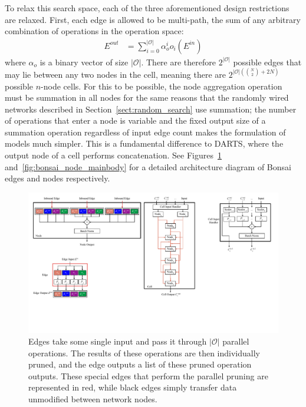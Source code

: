 To relax this search space, each of the three aforementioned design restrictions are relaxed. First, each edge is allowed to
be multi-path, the sum of any arbitrary combination of operations in the operation space:
\begin{align}
	E^{out} &= \sum_{i=0}^{|\mathcal{O}|} \alpha_o^i  o_i (E^{in}) \label{eq:op_weights}
\end{align}
\noindent where $\alpha_o$ is a binary vector of size $|\mathcal{O}|$. There are therefore $2^{|\mathcal{O}|}$ possible edges
that may lie between any two nodes in the cell, meaning there
are $2^{|\mathcal{O}| \left(\binom{N}{2} + 2N\right)}$ possible $n$-node cells. For this to be possible, the node aggregation operation
must be summation in all nodes for the same reasons that the randomly wired networks described in Section~\ref{sect:random_search} use
summation; the number of operations that enter a node is variable and the fixed output size of a summation operation regardless
of input edge count makes the formulation of models much simpler.  This is a fundamental difference to DARTS,
where the output node of a cell performs concatenation. See Figures~\ref{fig:bonsai_edge_mainbody}
and~\ref{fig:bonsai_node_mainbody} for a detailed architecture diagram of Bonsai edges and nodes respectively.
\clearpage
\begin{figure}[ht!]
	\centering
	 \hspace*{-3cm}\includegraphics[width=.6\textwidth]{edge}
	\caption[Bonsai edge where $|\mathcal{O}|=4$]{Edges take some single input and pass it through $|\mathcal{O}|$ parallel operations.
The results of these operations are then individually pruned, and the edge outputs a list of these pruned operation outputs. These special
	edges that perform the parallel pruning are represented in red, while black edges simply transfer data unmodified between network nodes.}
	\label{fig:bonsai_edge_mainbody}
\end{figure}
